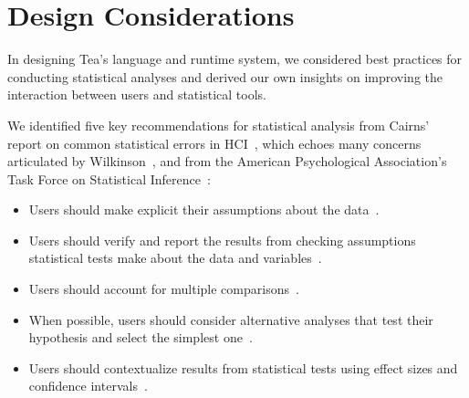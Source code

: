 \otherSystems

\section{Design Considerations} \label{sec:design}



In designing Tea's language and runtime system, we considered best practices for conducting statistical analyses and derived our own insights on improving the
interaction between users and statistical tools.

We identified five key recommendations for statistical analysis from Cairns' report on common
statistical errors in HCI~\cite{cairns2007hci}, which echoes many concerns articulated by Wilkinson~\cite{wilkinson1999statistical}, and from the American Psychological Association's
Task Force on Statistical Inference~\cite{APATFSI}: 
\begin{itemize}
    \item Users should make explicit their assumptions about the data~\cite{APATFSI}. 
    \item Users should verify and report the results from checking assumptions statistical tests make about the data
    and variables~\cite{cairns2007hci,APATFSI}.
    \item Users should account for multiple comparisons~\cite{cairns2007hci,APATFSI}.
    \item When possible, users should consider alternative analyses that test their hypothesis and select the simplest one~\cite{APATFSI}.
    \item Users should contextualize results from statistical tests using effect sizes and confidence intervals~\cite{APATFSI}.
\end{itemize}


